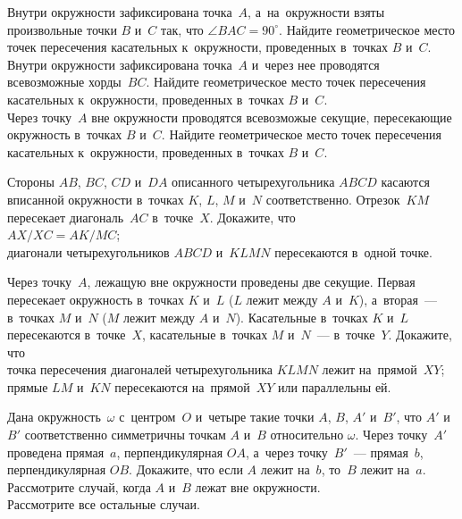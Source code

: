 


\begin{problems}

\item
\subproblem
Внутри окружности зафиксирована точка~$A$, а~на~окружности взяты произвольные
точки $B$ и~$C$ так, что $\angle BAC = 90^{\circ}$.
Найдите геометрическое место точек пересечения касательных к~окружности,
проведенных в~точках $B$ и~$C$.
\\
\subproblem
Внутри окружности зафиксирована точка~$A$ и~через нее проводятся всевозможные
хорды~$BC$.
Найдите геометрическое место точек пересечения касательных к~окружности,
проведенных в~точках $B$ и~$C$.
\\
\subproblem
Через точку~$A$ вне окружности проводятся всевозможые секущие, пересекающие
окружность в~точках $B$ и~$C$.
Найдите геометрическое место точек пересечения касательных к~окружности,
проведенных в~точках $B$ и~$C$.

\item
Стороны $AB$, $BC$, $CD$ и~$DA$ описанного четырехугольника $ABCD$ касаются
вписанной окружности в~точках $K$, $L$, $M$ и~$N$ соответственно.
Отрезок~$KM$ пересекает диагональ~$AC$ в~точке~$X$.
Докажите, что
\\
\subproblem
$AX / XC = AK / MC$;
\\
\subproblem
диагонали четырехугольников $ABCD$ и~$KLMN$ пересекаются в~одной точке.

\item
Через точку~$A$, лежащую вне окружности проведены две секущие.
Первая пересекает окружность в~точках $K$ и~$L$ ($L$ лежит между $A$ и~$K$),
а~вторая~--- в~точках $M$ и~$N$ ($M$ лежит между $A$ и~$N$).
Касательные в~точках $K$ и~$L$ пересекаются в~точке~$X$, касательные
в~точках $M$ и~$N$~--- в~точке~$Y$.
Докажите, что
\\
\subproblem
точка пересечения диагоналей четырехугольника $KLMN$ лежит на~прямой~$XY$;
\\
\subproblem
прямые $LM$ и~$KN$ пересекаются на~прямой~$XY$ или параллельны ей.

\item
Дана окружность~$\omega$ с~центром~$O$ и~четыре такие точки
$A$, $B$, $A'$ и~$B'$, что $A'$ и~$B'$ соответственно симметричны
точкам $A$ и~$B$ относительно $\omega$.
Через точку~$A'$ проведена прямая~$a$, перпендикулярная $OA$,
а~через точку~$B'$~--- прямая~$b$, перпендикулярная $OB$.
Докажите, что если $A$ лежит на~$b$, то~$B$ лежит на~$a$.
\\
\subproblem
Рассмотрите случай, когда $A$ и~$B$ лежат вне окружности.
\\
\subproblem
Рассмотрите все остальные случаи.


\end{problems}
